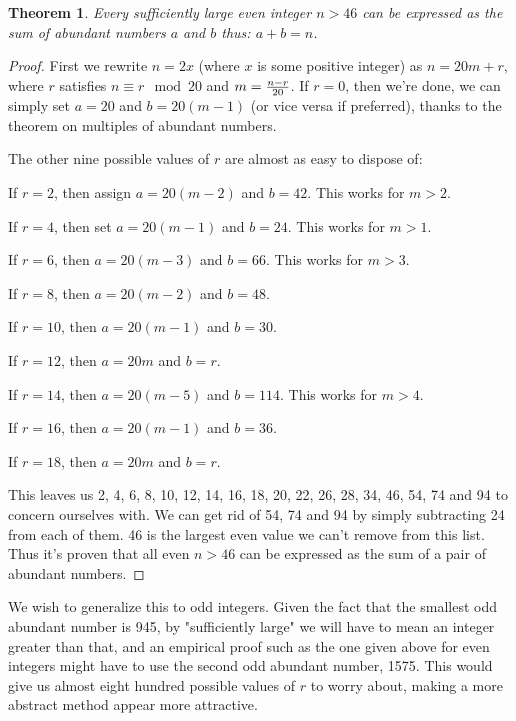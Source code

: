 \documentclass[12pt]{article}
\newtheorem*{thm}{Theorem}
\begin{document}
\begin{thm}
Every sufficiently large even integer $n > 46$ can be expressed as the sum of abundant numbers $a$ and $b$ thus: $a + b = n$.
\end{thm}
\begin{proof} 
First we rewrite $n = 2x$ (where $x$ is some positive integer) as $n = 20m + r$, where $r$ satisfies $n \equiv r \mod 20$ and $m = {{n - r} \over {20}}$. If $r = 0$, then we're done, we can simply set $a = 20$ and $b = 20(m - 1)$ (or vice versa if preferred), thanks to the theorem on multiples of abundant numbers.

The other nine possible values of $r$ are almost as easy to dispose of:

If $r = 2$, then assign $a = 20(m - 2)$ and $b = 42$. This works for $m > 2$.

If $r = 4$, then set $a = 20(m - 1)$ and $b = 24$. This works for $m > 1$.

If $r = 6$, then $a = 20(m - 3)$ and $b = 66$. This works for $m > 3$.

If $r = 8$, then $a = 20(m - 2)$ and $b = 48$.

If $r = 10$, then $a = 20(m - 1)$ and $b = 30$.

If $r = 12$, then $a = 20m$ and $b = r$.

If $r = 14$, then $a = 20(m - 5)$ and $b = 114$. This works for $m > 4$.

If $r = 16$, then $a = 20(m - 1)$ and $b = 36$.

If $r = 18$, then $a = 20m$ and $b = r$.

This leaves us 2, 4, 6, 8, 10, 12, 14, 16, 18, 20, 22, 26, 28, 34, 46, 54, 74 and 94 to concern ourselves with. We can get rid of 54, 74 and 94 by simply subtracting 24 from each of them. 46 is the largest even value we can't remove from this list. Thus it's proven that all even $n > 46$ can be expressed as the sum of a pair of abundant numbers.
\end{proof}

We wish to generalize this to odd integers. Given the fact that the smallest odd abundant number is 945, by "sufficiently large" we will have to mean an integer greater than that, and an empirical proof such as the one given above for even integers might have to use the second odd abundant number, 1575. This would give us almost eight hundred possible values of $r$ to worry about, making a more abstract method appear more attractive.
\end{document}

